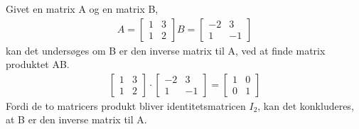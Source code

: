 \begin{eks}
Givet en matrix A og en matrix B,
\begin{align*}
A= \begin{bmatrix}
1 & 3 \\
1 & 2
\end{bmatrix}
B= \begin{bmatrix}
-2 & 3 \\
1 & -1
\end{bmatrix}
\end{align*}
kan det undersøges om B er den inverse matrix til A, ved at finde matrix produktet AB.
\begin{align*}
\begin{bmatrix}
1 & 3 \\
1 & 2
\end{bmatrix}
\cdot \begin{bmatrix}
-2 & 3 \\
1 & -1
\end{bmatrix}
= \begin{bmatrix}
1 & 0 \\
0 & 1
\end{bmatrix}
\end{align*}
Fordi de to matricers produkt bliver identitetsmatricen $I_2$, kan det konkluderes, at B er den inverse matrix til A.
\end{eks}




